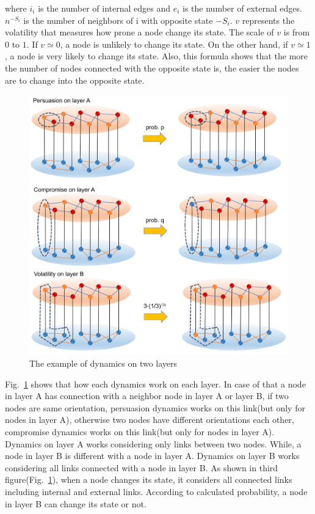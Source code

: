 \documentclass[review]{elsarticle}
\begin{document}
where $i_i$ is the number of internal edges and $e_i$ is the number of external edges. $n^{-S_i}$ is the number of neighbors of i with opposite state $-S_i$. $v$ represents the volatility that measures how prone a node change its state. The scale of $v$ is from $0$ to $1$. If $v \simeq 0$,  a node is unlikely to change its state. On the other hand, if $v \simeq 1$, a node is very likely to change its state. Also, this formula shows that the more the number of nodes connected with the opposite state is, the easier the nodes are to change into the opposite state.\\
\begin{figure}[!htb]
	\centering
	\includegraphics[width=\hsize]{total_dynamics.png}
	\caption{The example of dynamics on two layers}
	\label{total_dynamics}
\end{figure}

Fig.~\ref{total_dynamics} shows that how each dynamics work on each layer. In case of that a node in layer A has connection with a neighbor node in layer A or layer B, if two nodes are same orientation, persuasion dynamics works on this link(but only for nodes in layer A), otherwise two nodes have different orientations each other, compromise dynamics works on this link(but only for nodes in layer A). Dynamics on layer A works considering only links between two nodes. While, a node in layer B is different with a node in layer A. Dynamics on layer B works considering all links connected with a node in layer B. As shown in third figure(Fig.~\ref{total_dynamics}), when a node changes its state, it considers all connected links including internal and external links. According to calculated probability, a node in layer B can change its state or not.    
\end{document}
